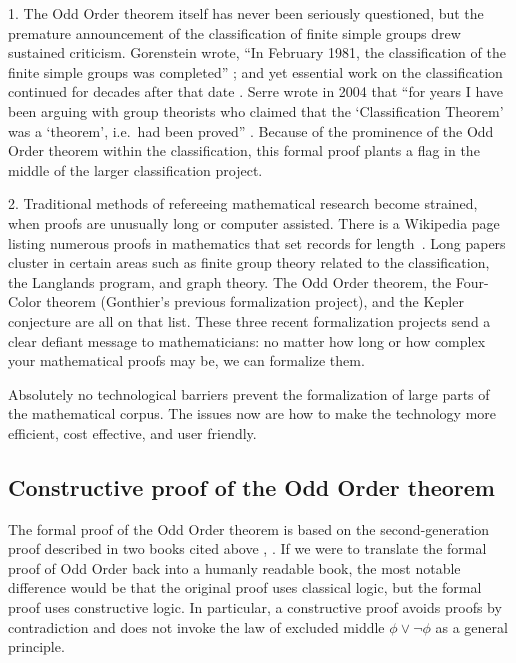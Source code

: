 \documentclass[brochure,english,12pt]{bourbaki}
\theoremstyle{plain}
\begin{document}
1. The Odd Order theorem itself has never been seriously questioned,
but the premature announcement of the classification of finite simple
groups drew sustained criticism.  Gorenstein wrote, ``In February
1981, the classification of the finite simple groups was completed''
\cite[page 1]{gorenstein2007finite}; and yet essential work on the
classification continued for decades after that date
\cite{aschbacher2004status}.  Serre wrote in 2004 that ``for years I
have been arguing with group theorists who claimed that the
`Classification Theorem' was a `theorem', i.e.\ had been proved''
\cite{raussen2004interview}.  Because of the prominence of the Odd
Order theorem within the classification, this formal proof plants a
flag in the middle of the larger classification project.




2. Traditional methods of refereeing mathematical research become
strained, when proofs are unusually long or computer assisted.  There
is a Wikipedia page listing numerous proofs in mathematics that set
records for length~\cite{WikiLong}.  Long papers cluster in certain
areas such as finite group theory related to the classification, the
Langlands program, and graph theory.  The Odd Order theorem, the
Four-Color theorem (Gonthier's previous formalization project), and
the Kepler conjecture are all on that list.  These three recent
formalization projects send a clear defiant message to mathematicians:
no matter how long or how complex your mathematical proofs may be, we
can formalize them.

Absolutely no technological barriers prevent the formalization of
large parts of the mathematical corpus.  The issues now are how to
make the technology more efficient, cost effective, and user friendly.

\subsection{Constructive proof of the Odd Order theorem}

The formal proof of the Odd Order theorem is based on the
second-generation proof described in two books cited above
\cite{bender1994local}, \cite{peterfalvi2000character}.  If we were to
translate the formal proof of Odd Order back into a humanly readable
book, the most notable difference would be that the original proof
uses classical logic, but the formal proof uses constructive logic.
In particular, a constructive proof avoids proofs by contradiction and
does not invoke  the law of excluded middle $\phi\lor \neg \phi$ as
a general principle.
\end{document}

